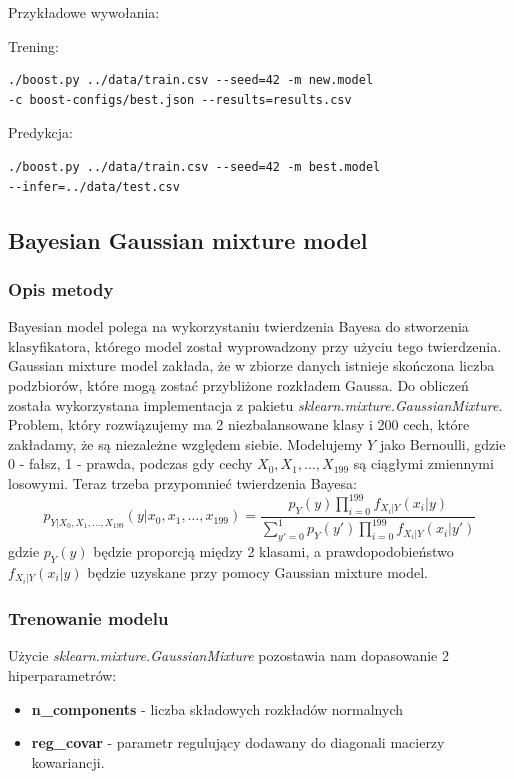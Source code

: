 \documentclass[12pt]{article}
\begin{document}
\noindent Przykładowe wywołania:

\noindent Trening:
\begin{lstlisting}
./boost.py ../data/train.csv --seed=42 -m new.model 
-c boost-configs/best.json --results=results.csv
\end{lstlisting}

\noindent Predykcja:
\begin{lstlisting}
./boost.py ../data/train.csv --seed=42 -m best.model
--infer=../data/test.csv
\end{lstlisting}


\subsection{Bayesian Gaussian mixture model}
\subsubsection{Opis metody}

Bayesian model polega na wykorzystaniu twierdzenia Bayesa do stworzenia klasyfikatora, którego model został wyprowadzony przy użyciu tego twierdzenia. Gaussian mixture model zakłada, że w zbiorze danych istnieje skończona liczba podzbiorów, które mogą zostać przybliżone rozkładem Gaussa. Do obliczeń została wykorzystana implementacja z pakietu \textit{sklearn.mixture.GaussianMixture}. \\
Problem, który rozwiązujemy ma 2 niezbalansowane klasy i 200 cech, które zakładamy, że są niezależne względem siebie. Modelujemy $Y$ jako Bernoulli, gdzie 0 - fałsz, 1 - prawda, podczas gdy cechy $X_{0}, X_{1}, ... , X_{199}$ są ciągłymi zmiennymi losowymi. Teraz trzeba przypomnieć twierdzenia Bayesa:
\begin{equation}
    p_{Y|X_0,X_1,\ldots,X_{199}}(y|x_0,x_1,\ldots,x_{199})=\frac{p_Y(y)\prod_{i=0}^{199}f_{X_i|Y}(x_i|y)}{\sum_{y'=0}^1p_Y(y')\prod_{i=0}^{199}f_{X_i|Y}(x_i|y')}
\end{equation}
gdzie $p_Y(y)$ będzie proporcją między 2 klasami, a prawdopodobieństwo $f_{X_i|Y}(x_i|y)$ będzie uzyskane przy pomocy Gaussian mixture model.

\subsubsection{Trenowanie modelu}
Użycie \textit{sklearn.mixture.GaussianMixture} pozostawia nam dopasowanie 2 hiperparametrów:
\begin{itemize}
    \item \textbf{n\_components} - liczba składowych rozkładów normalnych
    \item \textbf{reg\_covar} - parametr regulujący dodawany do diagonali macierzy kowariancji.
\end{itemize}
\end{document}
